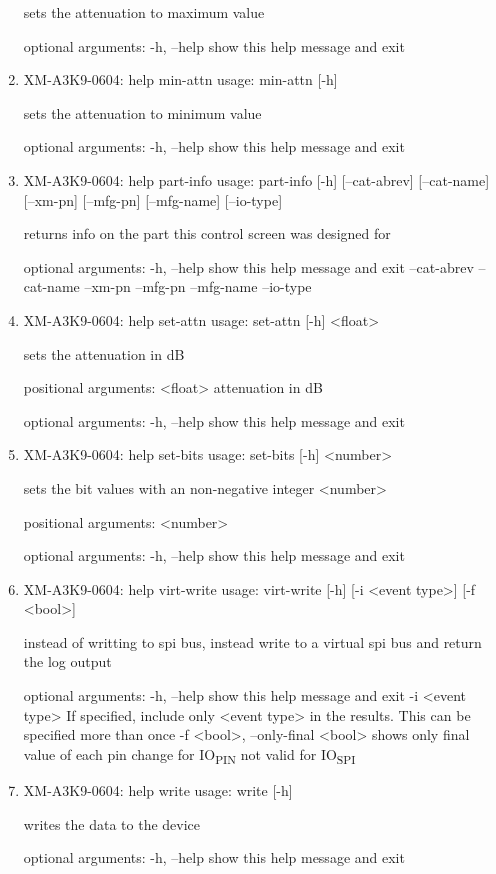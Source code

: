 \documentclass[11pt]{article}
\begin{document}
\begin{enumerate}
sets the attenuation to maximum value

optional arguments:
  -h, --help  show this help message and exit

\item XM-A3K9-0604: help min-attn
\label{sec:org90dd8ef}
usage: min-attn [-h]

sets the attenuation to minimum value

optional arguments:
  -h, --help  show this help message and exit

\item XM-A3K9-0604: help part-info
\label{sec:org1293b73}
usage: part-info  [-h] [--cat-abrev] [--cat-name] [--xm-pn] [--mfg-pn] [--mfg-name]
        [--io-type]

returns info on the part this control screen was designed for

optional arguments:
  -h, --help   show this help message and exit
  --cat-abrev
  --cat-name
  --xm-pn
  --mfg-pn
  --mfg-name
  --io-type

\item XM-A3K9-0604: help set-attn
\label{sec:org9671e51}
usage: set-attn [-h] <float>

sets the attenuation in dB

positional arguments:
  <float>     attenuation in dB

optional arguments:
  -h, --help  show this help message and exit

\item XM-A3K9-0604: help set-bits
\label{sec:orgfbce08e}
usage: set-bits [-h] <number>

sets the bit values with an non-negative integer <number>

positional arguments:
  <number>

optional arguments:
  -h, --help  show this help message and exit

\item XM-A3K9-0604: help virt-write
\label{sec:org93c66b8}
usage: virt-write [-h] [-i <event type>] [-f <bool>]

instead of writting to spi bus, instead write to a virtual spi bus and return
the log output

optional arguments:
  -h, --help            show this help message and exit
  -i <event type>       If specified, include only <event type> in the
                        results. This can be specified more than once
  -f <bool>, --only-final <bool>
                        shows only final value of each pin change for IO\textsubscript{PIN}
                        not valid for IO\textsubscript{SPI}

\item XM-A3K9-0604: help write
\label{sec:org096280e}
usage: write [-h]

writes the data to the device

optional arguments:
  -h, --help  show this help message and exit
\end{enumerate}
\end{document}
